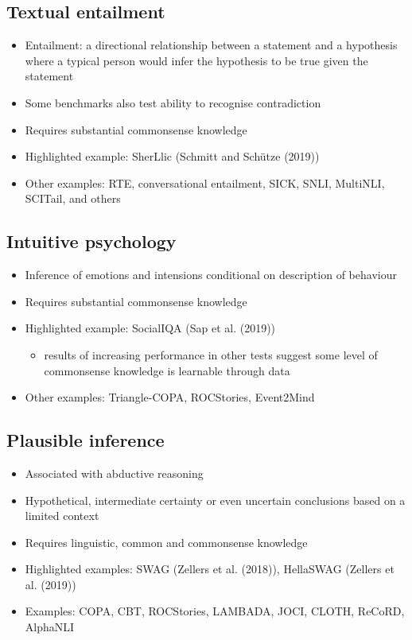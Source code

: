 \documentclass[
]{article}
\providecommand{\tightlist}{%
  \setlength{\itemsep}{0pt}\setlength{\parskip}{0pt}}\usepackage{longtable,booktabs,array}
\theoremstyle{plain}
\theoremstyle{definition}
\theoremstyle{remark}
\begin{document}
\subsection{Textual entailment}\label{textual-entailment}

\begin{itemize}
\tightlist
\item
  Entailment: a directional relationship between a statement and a
  hypothesis where a typical person would infer the hypothesis to be
  true given the statement
\item
  Some benchmarks also test ability to recognise contradiction
\item
  Requires substantial commonsense knowledge
\item
  Highlighted example: SherLlic (Schmitt and Schütze (2019))
\item
  Other examples: RTE, conversational entailment, SICK, SNLI, MultiNLI,
  SCITail, and others
\end{itemize}

\subsection{Intuitive psychology}\label{intuitive-psychology}

\begin{itemize}
\tightlist
\item
  Inference of emotions and intensions conditional on description of
  behaviour
\item
  Requires substantial commonsense knowledge
\item
  Highlighted example: SocialIQA (Sap et al. (2019))

  \begin{itemize}
  \tightlist
  \item
    results of increasing performance in other tests suggest some level
    of commonsense knowledge is learnable through data
  \end{itemize}
\item
  Other examples: Triangle-COPA, ROCStories, Event2Mind
\end{itemize}

\subsection{Plausible inference}\label{plausible-inference}

\begin{itemize}
\tightlist
\item
  Associated with abductive reasoning
\item
  Hypothetical, intermediate certainty or even uncertain conclusions
  based on a limited context
\item
  Requires linguistic, common and commonsense knowledge
\item
  Highlighted examples: SWAG (Zellers et al. (2018)), HellaSWAG (Zellers
  et al. (2019))
\item
  Examples: COPA, CBT, ROCStories, LAMBADA, JOCI, CLOTH, ReCoRD,
  AlphaNLI
\end{itemize}
\end{document}
